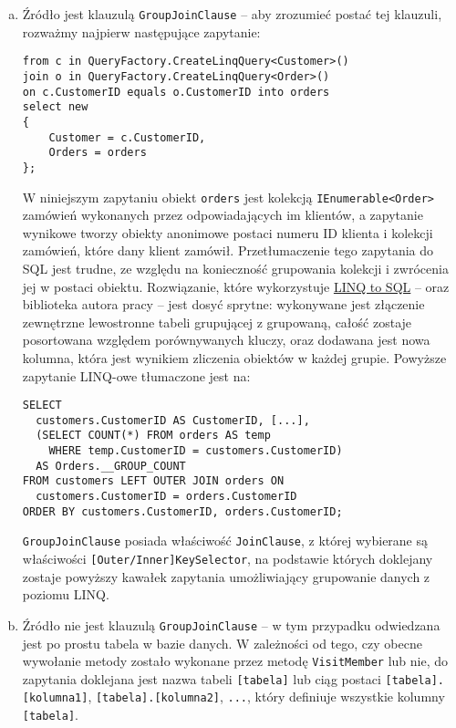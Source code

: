 \begin{enumerate}[a)]
\item Źródło jest klauzulą \texttt{GroupJoinClause} – aby zrozumieć postać tej klauzuli, rozważmy najpierw następujące zapytanie:

\begin{lstlisting}
from c in QueryFactory.CreateLinqQuery<Customer>()
join o in QueryFactory.CreateLinqQuery<Order>()
on c.CustomerID equals o.CustomerID into orders
select new
{
    Customer = c.CustomerID,
    Orders = orders
};
\end{lstlisting}

W niniejszym zapytaniu obiekt \texttt{orders} jest kolekcją \texttt{IEnumerable<Order>} zamówień wykonanych przez odpowiadających im klientów, a zapytanie wynikowe tworzy obiekty anonimowe postaci numeru ID klienta i kolekcji zamówień, które dany klient zamówił. Przetłumaczenie tego zapytania do SQL jest trudne, ze względu na konieczność grupowania kolekcji i zwrócenia jej w postaci obiektu. Rozwiązanie, które wykorzystuje \href{https://msdn.microsoft.com/pl-pl/library/bb882643(v=vs.110).aspx}{LINQ to SQL} – oraz biblioteka autora pracy – jest dosyć sprytne: wykonywane jest złączenie zewnętrzne lewostronne tabeli grupującej z grupowaną, całość zostaje posortowana względem porównywanych kluczy, oraz dodawana jest nowa kolumna, która jest wynikiem zliczenia obiektów w każdej grupie. Powyższe zapytanie LINQ-owe tłumaczone jest na:

\begin{lstlisting}
SELECT 
  customers.CustomerID AS CustomerID, [...], 
  (SELECT COUNT(*) FROM orders AS temp 
    WHERE temp.CustomerID = customers.CustomerID) 
  AS Orders.__GROUP_COUNT
FROM customers LEFT OUTER JOIN orders ON 
  customers.CustomerID = orders.CustomerID
ORDER BY customers.CustomerID, orders.CustomerID;
\end{lstlisting}

\texttt{GroupJoinClause} posiada właściwość \texttt{JoinClause}, z której wybierane są właściwości \texttt{[Outer/Inner]KeySelector}, na podstawie których doklejany zostaje powyższy kawałek zapytania umożliwiający grupowanie danych z poziomu LINQ.

\item Źródło nie jest klauzulą \texttt{GroupJoinClause} – w tym przypadku odwiedzana jest po prostu tabela w bazie danych. W zależności od tego, czy obecne wywołanie metody zostało wykonane przez metodę \texttt{VisitMember} lub nie, do zapytania doklejana jest nazwa tabeli \texttt{[tabela]} lub ciąg postaci \texttt{[tabela].[kolumna1]}, \linebreak \texttt{[tabela].[kolumna2]}, \texttt{...}, który definiuje wszystkie kolumny \texttt{[tabela]}.
\end{enumerate}

